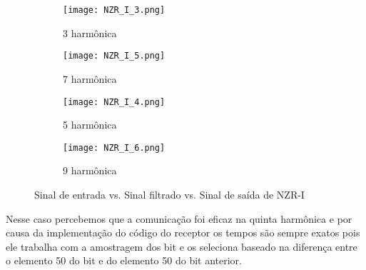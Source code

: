 \documentclass{article}
\begin{document}
            \begin{figure}[H]
                \begin{multicols}{2}
                    \begin{figure}[H]
                        \begin{center}
                            \texttt{[image: NZR\_I\_3.png]}
                            \caption{3 harmônica}
                            \label{fig:NZR_I_3}
                        \end{center}
                    \end{figure}
                    \begin{figure}[H]
                        \begin{center}
                            \texttt{[image: NZR\_I\_5.png]}
                            \caption{7 harmônica}
                            \label{fig:NZR_I_5}
                        \end{center}
                    \end{figure}
                
                    \begin{figure}[H]
                        \begin{center}
                            \texttt{[image: NZR\_I\_4.png]}
                            \caption{5 harmônica}
                            \label{fig:NZR_I_4}
                        \end{center}
                    \end{figure}
                    \begin{figure}[H]
                        \begin{center}
                            \texttt{[image: NZR\_I\_6.png]}
                            \caption{9 harmônica}
                            \label{fig:NZR_I_6}
                        \end{center}
                    \end{figure}
                \end{multicols}
                \caption{Sinal de entrada vs. Sinal filtrado vs. Sinal de saída de NZR-I}
                \label{fig:NZR_I}
            \end{figure}
            Nesse caso percebemos que a comunicação foi eficaz na quinta harmônica e por causa da implementação do código do receptor os tempos são sempre exatos pois ele trabalha com a amostragem dos bit e os seleciona baseado na diferença entre o elemento 50 do bit e do elemento 50 do bit anterior.
            
\end{document}
